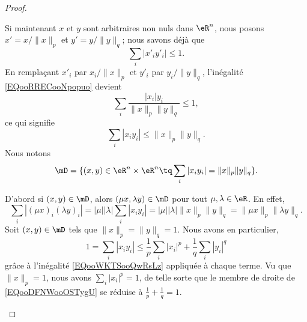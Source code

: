 \begin{proof}
\begin{subproof}
		Si maintenant \( x\) et \( y\) sont arbitraires non nuls dans \( \eR^n\), nous posons \( x'=x/\| x \|_p\) et \( y'=y/\| y \|_q\); nous savons déjà que
		\begin{equation}        \label{EQooRRECooNpopuo}
			\sum_i| x'_iy'_i |\leq 1.
		\end{equation}
		En remplaçant \( x'_i\) par \( x_i/\| x \|_p\) et \( y'_i\) par \( y_i/\| y \|_q\), l'inégalité \eqref{EQooRRECooNpopuo} devient
		\begin{equation}
			\sum_i\frac{ | x_i |y_i }{ \| x \|_p\| y \|_q  }\leq 1,
		\end{equation}
		ce qui signifie
		\begin{equation}
			\sum_i| x_iy_i |\leq \| x \|_p\| y \|_q.
		\end{equation}
		Nous notons
		\begin{equation}
			\mD=\{ (x,y)\in \eR^n\times \eR^n\tq \sum_i| x_iy_i |=\| x \|_p\| y \|_q \}.
		\end{equation}
		\begin{subproof}
			\spitem[Multiplications]
			D'abord si \( (x,y)\in\mD\), alors \( (\mu x, \lambda y)\in \mD\) pour tout \( \mu,\lambda\in \eR\). En effet,
			\begin{equation}
				\sum_i| (\mu x)_i(\lambda y)_i |=| \mu | |\lambda |\sum_i| x_iy_i |=| \mu | |\lambda |\| x \|_p\| y \|_q=\|\mu x \|_p\| \lambda y \|_q.
			\end{equation}
			Soit \( (x,y)\in \mD\) tels que \( \| x \|_p=\| y \|_q=1\). Nous avons en particulier,
			\begin{equation}    \label{EQooDFNWooOSTygU}
				1=\sum_i| x_iy_i |\leq \frac{1}{ p }\sum_i| x_i |^p+\frac{1}{ q }\sum_i| y_i |^q
			\end{equation}
			grâce à l'inégalité \eqref{EQooWKTSooQwRsLz} appliquée à chaque terme. Vu que \( \| x \|_p=1\), nous avons \( \sum_i| x_i |^p=1\), de telle sorte que le membre de droite de \eqref{EQooDFNWooOSTygU} se réduise à \( \frac{1}{ p }+\frac{1}{ q }=1\).


\end{subproof}
\end{subproof}
\end{proof}
